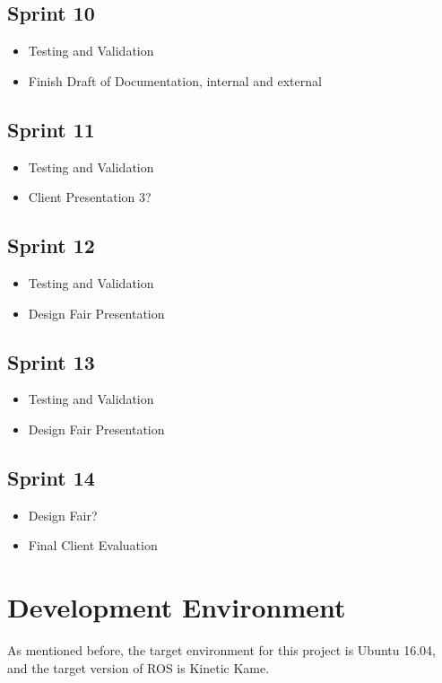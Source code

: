 \subsection{Sprint 10}
\begin{itemize}
	\item Testing and Validation
	\item Finish Draft of Documentation, internal and external
\end{itemize}

\subsection{Sprint 11}
\begin{itemize}
	\item Testing and Validation
	\item Client Presentation 3?
\end{itemize}

\subsection{Sprint 12}
\begin{itemize}
	\item Testing and Validation
	\item Design Fair Presentation
\end{itemize}

\subsection{Sprint 13}
\begin{itemize}
	\item Testing and Validation
	\item Design Fair Presentation
\end{itemize}

\subsection{Sprint 14}
\begin{itemize}
	\item Design Fair?
	\item Final Client Evaluation
\end{itemize}

\section{Development Environment}
As mentioned before, the target environment for this project is Ubuntu 16.04, and the target version of ROS is Kinetic Kame.


